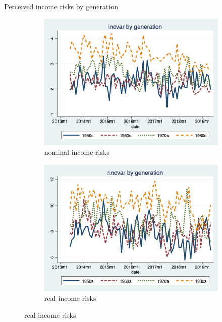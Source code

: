 \documentclass{beamer}
\begin{document}
\begin{frame}{Perceived income risks by generation}
	\begin{figure}[ht]
		\label{ts_incvar_byear_g_mean}
		\begin{subfigure}[b]{0.7\textwidth}
			\centering
			\caption{nominal income risks}
			\includegraphics[width=\textwidth, height = 0.33\textheight]{figures/ts_incvar_byear_g_mean.png}
		\end{subfigure}
		\begin{subfigure}[b]{0.7\textwidth}
			\caption{real income risks}
			\includegraphics[width=\textwidth, height = 0.33\textheight]{figures/ts_rincvar_byear_g_mean.png}
		\end{subfigure}
	\end{figure}
\end{frame}
\end{document}
